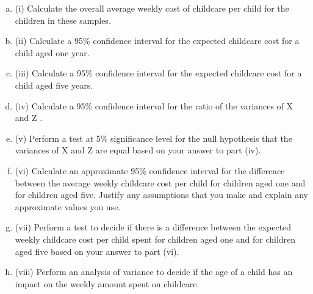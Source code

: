\documentclass[a4paper,12pt]{article}
\begin{document}
\begin{enumerate}[(a)]
\item (i)
Calculate the overall average weekly cost of childcare per child for the
children in these samples.

\item (ii) Calculate a 95\% confidence interval for the expected childcare cost for a child
aged one year.

\item (iii) Calculate a 95\% confidence interval for the expected childcare cost for a child
aged five years.

\item (iv) Calculate a 95\% confidence interval for the ratio of the variances of X and Z .

\item (v) Perform a test at 5\% significance level for the null hypothesis that the
variances of X and Z are equal based on your answer to part (iv).

\item (vi) Calculate an approximate 95\% confidence interval for the difference between
the average weekly childcare cost per child for children aged one and for
children aged five. Justify any assumptions that you make and explain any
approximate values you use.

\item (vii) Perform a test to decide if there is a difference between the expected weekly
childcare cost per child spent for children aged one and for children aged five
based on your answer to part (vi).

\item (viii) Perform an analysis of variance to decide if the age of a child has an impact on
the weekly amount spent on childcare.
\end{enumerate}
\end{document}
